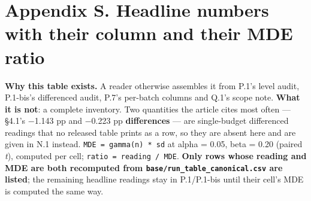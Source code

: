 \documentclass[pdflatex,sn-mathphys-ay]{sn-jnl}
\begin{document}
\section*{Appendix S. Headline numbers with their column and their MDE ratio}

\textbf{Why this table exists.} A reader otherwise assembles it from P.1's level audit, P.1-bis's differenced audit, P.7's per-batch columns and Q.1's scope note. \textbf{What it is not}: a complete inventory. Two quantities the article cites most often --- \S{}4.1's \ensuremath{-}1.143 pp and \ensuremath{-}0.223 pp \textbf{differences} --- are single-budget differenced readings that no released table prints as a row, so they are absent here and are given in N.1 instead. \texttt{MDE = gamma(n) * sd} at alpha = 0.05, beta = 0.20 (paired \emph{t}), computed per cell; \texttt{ratio = \textbar{}reading\textbar{} / MDE}. \textbf{Only rows whose reading and MDE are both recomputed from \texttt{base/run\_table\_canonical.csv} are listed}; the remaining headline readings stay in P.1/P.1-bis until their cell's MDE is computed the same way.
\end{document}
